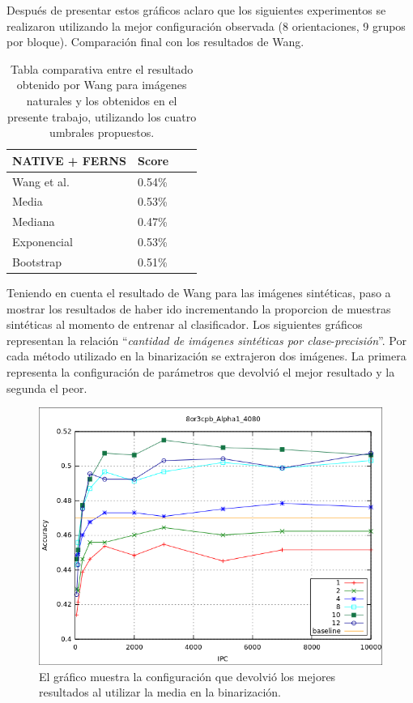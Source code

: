 		Después de presentar estos gráficos aclaro que los siguientes experimentos se realizaron utilizando la mejor configuración observada (8 orientaciones, 9 grupos por bloque). Comparación final con los resultados de Wang.
	\begin{table}
		\centering
		\begin{tabular}{ | l | l | l | p{5cm} |}
    			\hline
    				\textbf{NATIVE + FERNS} & \textbf{Score} \\ \hline
    				Wang et al. & 0.54\% \\ \hline
    				Media & 0.53\% \\ \hline
    				Mediana & 0.47\%\\ \hline
    				Exponencial & 0.53\% \\ \hline
    				Bootstrap & 0.51\%\\ 
    			\hline
    		\end{tabular}
    		\caption{Tabla comparativa entre el resultado obtenido por Wang para imágenes naturales y los obtenidos en el presente trabajo, utilizando los cuatro umbrales propuestos.}
    	\end{table}
    	
    	\newpage
    	Teniendo en cuenta el resultado de Wang para las imágenes sintéticas, paso a mostrar 
los resultados de haber ido incrementando la proporcion de muestras sintéticas al momento de entrenar al clasificador. Los siguientes gráficos representan la relación ``\textit{cantidad de imágenes sintéticas por clase}-\textit{precisión}''. Por cada método utilizado en la binarización se extrajeron dos imágenes. La primera representa la configuración de parámetros que devolvió el mejor resultado y la segunda el peor.

			\begin{figure}[htbp]
				\centering
				\includegraphics[scale=0.6]{img/resultados/sinteticas/best_media_8or3cpb_Alpha1_4080.png}
				\caption[Sintéticas media mejor resultado]{El gráfico muestra la configuración que devolvió los mejores resultados al utilizar la media en la binarización.}
				\label{fig: Sinteticas-media-mejor}
			\end{figure}
			
